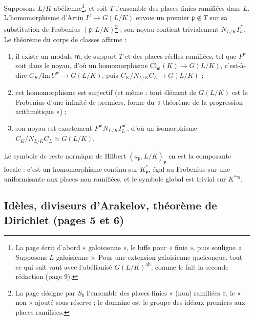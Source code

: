 \documentclass[11pt,a4paper]{article}
\begin{document}
Supposons $L/K$ abélienne\footnote{La page écrit d'abord « galoisienne », le
biffe pour « finie », puis souligne « Supposons $L$ galoisienne ». Pour une
extension galoisienne quelconque, tout ce qui suit vaut avec l'abélianisé
$G(L/K)^{\mathrm{ab}}$, comme le fait la seconde rédaction (page 9).}, et soit
$T$ l'ensemble des places finies ramifiées dans $L$. L'homomorphisme d'Artin
$I^{T} \to G(L/K)$ envoie un premier $\mathfrak{p} \notin T$ sur sa substitution
de Frobenius $(\mathfrak{p}, L/K)$\footnote{La page désigne par $S_0$
l'ensemble des places finies « (non) ramifiées », le « non » ajouté sous réserve ;
le domaine est le groupe des idéaux premiers aux places ramifiées.} ; son noyau
contient trivialement $N_{L/K} I^{T}_L$. Le théorème du corps de classes
affirme :
\begin{enumerate}
\item[(a)] il existe un module $\mathfrak{m}$, de support $T$ et des places
réelles ramifiées, tel que $P^{\mathfrak{m}}$ soit dans le noyau, d'où un
homomorphisme $\mathrm{Cl}_{\mathfrak{m}}(K) \to G(L/K)$, c'est-à-dire
$C_K/\mathrm{Im}\,U^{\mathfrak{m}} \to G(L/K)$, puis $C_K/N_{L/K}C_L \to G(L/K)$ ;
\item[(b)] cet homomorphisme est surjectif (et même : tout élément de $G(L/K)$
est le Frobenius d'une infinité de premiers, forme du « théorème de la
progression arithmétique ») ;
\item[(c)] son noyau est exactement $P^{\mathfrak{m}} N_{L/K} I^{\mathfrak{m}'}_L$,
d'où un isomorphisme $C_K/N_{L/K} C_L \simeq G(L/K)$.
\end{enumerate}
Le symbole de reste normique de Hilbert $(a_{\mathfrak{p}}, L/K)_{\mathfrak{p}}$
en est la composante locale : c'est un homomorphisme continu sur
$K^{*}_{\mathfrak{p}}$, égal au Frobenius sur une uniformisante aux places non
ramifiées, et le symbole global est trivial sur $K^{*\mathfrak{m}}$.

\subsection*{Idèles, diviseurs d'Arakelov, théorème de Dirichlet (pages 5 et 6)}
\end{document}
